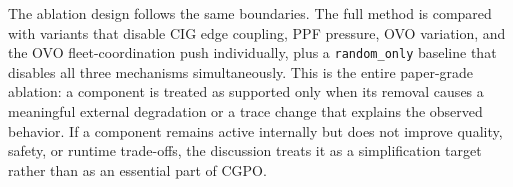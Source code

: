 The ablation design follows the same boundaries. The full method is compared with variants that disable CIG edge coupling, PPF pressure, OVO variation, and the OVO fleet-coordination push individually, plus a \texttt{random\_only} baseline that disables all three mechanisms simultaneously. This is the entire paper-grade ablation: a component is treated as supported only when its removal causes a meaningful external degradation or a trace change that explains the observed behavior. If a component remains active internally but does not improve quality, safety, or runtime trade-offs, the discussion treats it as a simplification target rather than as an essential part of CGPO.
